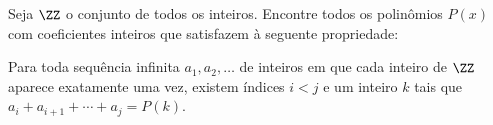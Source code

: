 Seja $\ZZ$ o conjunto de todos os inteiros. Encontre todos os polinômios $P(x)$ com coeficientes inteiros que satisfazem à seguente propriedade:

Para toda sequência infinita $a_1, a_2, \dots$ de inteiros em que cada inteiro de $\ZZ$ aparece exatamente uma vez, existem índices $i < j$ e um inteiro $k$ tais que $a_i + a_{i+1} + \cdots + a_j = P(k)$.
